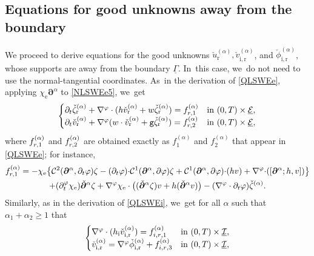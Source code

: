 \documentclass[11pt]{article}
\newcommand{\gr}{{\mathtt g}}
\newcommand{\dt}{\partial_t}
\newcommand{\cI}{{\mathcal I}}
\newcommand{\cE}{{\mathcal E}}
\newcommand{\ul}[1]{\underline{#1}}
\newcommand{\itGamma}{\mathit{\Gamma}}
\theoremstyle{definition}
\begin{document}
\subsection{Equations for good unknowns away from the boundary}\label{subsect:EqGUb}
We proceed to derive equations for the good unknowns $\check{u}_\mathrm{r}^{(\alpha)},\check{v}_\mathrm{i,r}^{(\alpha)}$, and $\check{\phi}_\mathrm{i,r}^{(\alpha)}$,
whose supports are away from the boundary $\ul{\itGamma}$. In~this case, we~do not need to use the normal-tangential coordinates. As~in the derivation of \eqref{QLSWEe}, applying $\chi_\mathrm{e}\bm{\partial}^\alpha$ to \eqref{NLSWEe5}, we~get
\begin{equation}\label{QLSWEr}
\begin{cases}
\dt\check{\zeta}_\mathrm{r}^{(\alpha)}+\nabla^\varphi\cdot(h\check{v}_\mathrm{r}^{(\alpha)}+w\check{\zeta}_\mathrm{r}^{(\alpha)}) = f_{{\rm r},1}^{(\alpha)}
&\text{in } (0,T)\times\ul{\cE}, \\
\dt\check{v}_\mathrm{r}^{(\alpha)}+\nabla^\varphi(w\cdot\check{v}_\mathrm{r}^{(\alpha)}+\gr\check{\zeta}_\mathrm{r}^{(\alpha)}) = f_{{\rm r},2}^{(\alpha)}
&\text{in } (0,T)\times\ul{\cE},
\end{cases}
\end{equation}
where $f_{{\rm r},1}^{(\alpha)}$ and $f_{{\rm r},2}^{(\alpha)}$ are obtained exactly as $f_{1}^{(\alpha)}$ and $f_{2}^{(\alpha)}$ that appear in \eqref{QLSWEe};
for instance,
\begin{multline*}
f_{{\rm r},1}^{(\alpha)}
= -\chi_\mathrm{e} \big\{ {\mathcal C}^2(\bm{\partial}^\alpha,\dt\varphi)\zeta
- (\dt\varphi){\cdot} {\mathcal C}^1(\bm{\partial}^\alpha,\partial\varphi)\zeta
+{\mathcal C}^1(\bm{\partial}^\alpha,\partial\varphi){\cdot} (hv)+ \nabla^\varphi{\cdot}([\bm{\partial}^\alpha;h,v]) \big\} \\
+ (\dt^\varphi\chi_\mathrm{e}) \check{\bm{\partial}}^\alpha\zeta
+ \nabla^\varphi\chi_\mathrm{e}\cdot\bigl((\check{\bm{\partial}}^\alpha \zeta)v + h (\check{\bm{\partial}}^\alpha v) \bigr)
- (\nabla^\varphi\cdot\dt\varphi)\check{\zeta}^{(\alpha)}.
\end{multline*}
Similarly, as in the derivation of \eqref{QLSWEi}, we~get for all $\alpha$ such that $\alpha_1+\alpha_2\geq 1$ that
\begin{equation}\label{QLSWEir}
\begin{cases}
\nabla^\varphi\cdot(h_\mathrm{i}\check{v}_\mathrm{i,r}^{(\alpha)}) = f_{{\rm i,r},1}^{(\alpha)} &\text{in } (0,T)\times\ul{\cI}, \\
\check{v}_\mathrm{i,r}^{(\alpha)} = \nabla^\varphi\check{\phi}_\mathrm{i,r}^{(\alpha)} + f_{{\rm i,r},3}^{(\alpha)} &\text{in } (0,T)\times\ul{\cI},
\end{cases}
\end{equation}
\end{document}
